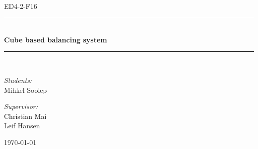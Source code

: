 \newcommand{\HRule}{\rule{\linewidth}{0.5 mm}}
\begin{titlepage}

\begin{center}
\\[0.5cm]

\textsc{\Large ED4-2-F16}\\[0.6cm]

\HRule \\[0.9cm]
{ \Huge \bfseries Cube based balancing system }\\[0.4cm]

\HRule \\[0.5cm]


\begin{minipage}{0.49\textwidth}
\begin{flushleft} \large
\emph{Students:}\\
Mihkel Soolep\\

\end{flushleft}
\end{minipage}
\begin{minipage}{0.49\textwidth}
\begin{flushright} \large
\emph{Supervisor:} \\
Christian Mai\\
Leif Hansen
\end{flushright}
\end{minipage}

\vfill

{\large \today}



\end{center}

\end{titlepage}